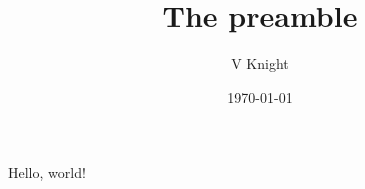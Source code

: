 \documentclass{article} %
\title{The preamble}
\author{V Knight}
\date{\today}
\begin{document}

\maketitle

Hello, world!
\end{document}
